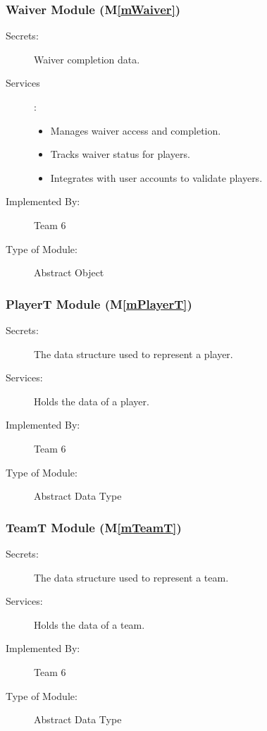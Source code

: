 \documentclass[12pt, titlepage]{article}
\newcommand{\mref}[1]{M\ref{#1}}
\begin{document}
  \subsubsection{Waiver Module (\mref{mWaiver})}

  \begin{description}
    \item[Secrets:] Waiver completion data.
    \item[Services] :
      \begin{itemize}
        \item Manages waiver access and completion.
        \item Tracks waiver status for players.
        \item Integrates with user accounts to validate players.
      \end{itemize}
    \item[Implemented By:] Team 6
    \item[Type of Module:] Abstract Object
    \end{description}

  \subsubsection{PlayerT Module (\mref{mPlayerT})}

  \begin{description}
    \item[Secrets:] The data structure used to represent a player.
    \item[Services:] Holds the data of a player.
    \item[Implemented By:] Team 6
    \item[Type of Module:] Abstract Data Type
  \end{description}

  \subsubsection{TeamT Module (\mref{mTeamT})}

  \begin{description}
    \item[Secrets:] The data structure used to represent a team.
    \item[Services:] Holds the data of a team.
    \item[Implemented By:] Team 6
    \item[Type of Module:] Abstract Data Type
  \end{description}
    
\end{document}
